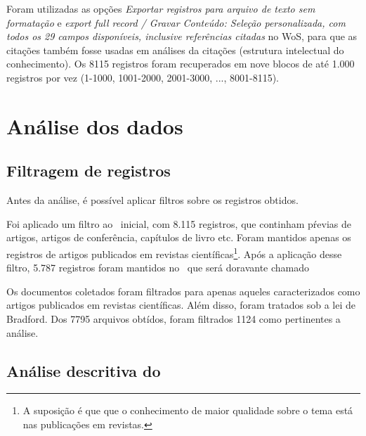Foram utilizadas as opções \textit{Exportar registros para arquivo de texto sem formatação} e \textit{export full record / Gravar Conteúdo: Seleção personalizada, com todos os 29 campos disponíveis, inclusive referências citadas} no WoS, para que as citações também fosse usadas em análises da citações (estrutura intelectual do conhecimento). Os 8115 registros foram recuperados em nove blocos de até 1.000 registros por vez (1-1000, 1001-2000, 2001-3000, ..., 8001-8115).


\section{Análise dos dados}

\subsection{Filtragem de registros}
Antes da análise, é possível aplicar filtros sobre os registros obtidos.

Foi aplicado um filtro ao \dataset\   inicial, com 8.115 registros, que continham pŕevias de artigos, artigos de conferência, capítulos de livro etc. Foram mantidos apenas os registros de artigos publicados em revistas científicas\footnote{A suposição é que que o conhecimento de maior qualidade sobre o tema está nas publicações em revistas.}. Após a aplicação desse filtro, 5.787 registros foram mantidos no \dataset\, que será doravante chamado

Os documentos coletados foram filtrados para apenas aqueles caracterizados como artigos publicados em revistas científicas. Além disso, foram tratados sob a lei de Bradford. Dos 7795 arquivos obtídos, foram filtrados  1124 como pertinentes a análise.

\subsection{Análise descritiva do \dataset\   }

